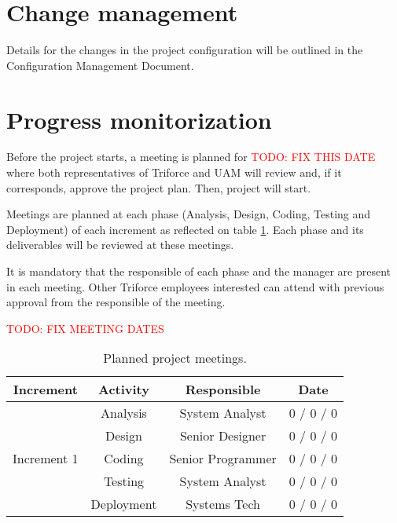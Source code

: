 \section{Change management}

Details for the changes in the project configuration will be outlined in the Configuration Management Document.

\section{Progress monitorization}

Before the project starts, a meeting is planned for \textcolor{red}{TODO: FIX THIS DATE} where both representatives of Triforce and UAM will review and, if it corresponds, approve the project plan. Then, project will start.

Meetings are planned at each phase (Analysis, Design, Coding, Testing and Deployment) of each increment as reflected on table \ref{tblPlannedMeetings}. Each phase and its deliverables will be reviewed at these meetings.

It is mandatory that the responsible of each phase and the manager are present in each meeting. Other Triforce employees interested can attend with previous approval from the responsible of the meeting.

\textcolor{red}{TODO: FIX MEETING DATES}

\begin{table}[hbtp]
\centering
\begin{tabular}{|c|c|c|c|}
\hline
\textbf{Increment} & \textbf{Activity} & \textbf{Responsible} & \textbf{Date} \\ \hline
\multirow{5}{*}{Increment 1} & Analysis & System Analyst & 0 / 0 / 0 \\ \cline{2-4}
 & Design & Senior Designer & 0 / 0 / 0 \\ \cline{2-4}
 & Coding & Senior Programmer & 0 / 0 / 0 \\ \cline{2-4}
 & Testing & System Analyst & 0 / 0 / 0 \\ \cline{2-4}
 & Deployment & Systems Tech & 0 / 0 / 0 \\ \hline
\end{tabular}
\caption{Planned project meetings.}
\label{tblPlannedMeetings}
\end{table}

